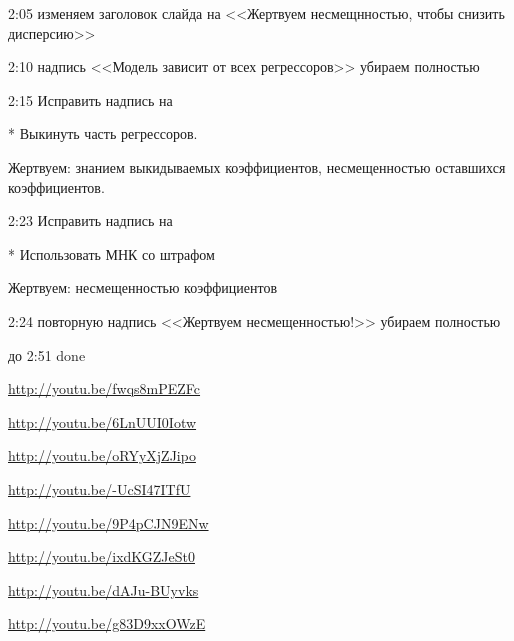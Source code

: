 \documentclass[12pt,a4paper]{article}
\begin{document}
2:05 изменяем заголовок слайда на <<Жертвуем несмещнностью, чтобы снизить дисперсию>>

2:10 надпись <<Модель зависит от всех регрессоров>> убираем полностью

2:15 Исправить надпись на 

* Выкинуть часть регрессоров. 

Жертвуем: знанием выкидываемых коэффициентов, несмещенностью оставшихся коэффициентов.

2:23 Исправить надпись на

* Использовать МНК со штрафом

Жертвуем: несмещенностью коэффициентов

2:24 повторную надпись <<Жертвуем несмещенностью!>> убираем полностью

до 2:51 done


  \url{http://youtu.be/fwqs8mPEZFc}

\url{http://youtu.be/6LnUUI0Iotw}

\url{http://youtu.be/oRYyXjZJipo}

 \url{http://youtu.be/-UcSI47ITfU}

\url{http://youtu.be/9P4pCJN9ENw}

\url{http://youtu.be/ixdKGZJeSt0}

\url{http://youtu.be/dAJu-BUyvks}

\url{http://youtu.be/g83D9xxOWzE}
\end{document}

